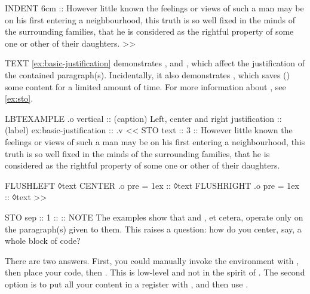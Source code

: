 \begin{lbt}
      INDENT 6cm :: However little known the feelings or views of such a man may be on his first entering a neighbourhood, this truth is so well fixed in the minds of the surrounding families, that he is considered as the rightful property of some one or other of their daughters.
    >>

    TEXT \cref{ex:basic-justification} demonstrates ,  and , which affect the justification of the contained paragraph(s). Incidentally, it also demonstrates , which saves () some content for a limited amount of time. For more information about , see \cref{ex:sto}.

    LBTEXAMPLE .o vertical
    :: (caption) Left, center and right justification
    :: (label) ex:basic-justification
    :: .v <<
      STO text :: 3 :: However little known the feelings or views of such a man may be on his first entering a neighbourhood, this truth is so well fixed in the minds of the surrounding families, that he is considered as the rightful property of some one or other of their daughters.

      FLUSHLEFT ◊text
      CENTER .o pre = 1ex :: ◊text
      FLUSHRIGHT .o pre = 1ex :: ◊text
    >>

    STO sep :: 1 :: {:}{:}
    NOTE The examples show that  and , et cetera, operate only on the paragraph(s) given to them. This raises a question: how do you center, say, a whole block of \lbtlogo{} code? \par There are two answers. First, you could manually invoke the  environment with , then place your code, then . This is low-level and not in the spirit of \lbtlogo. The second option is to put all your content in a register with , and then use . \par {}

\end{lbt}
